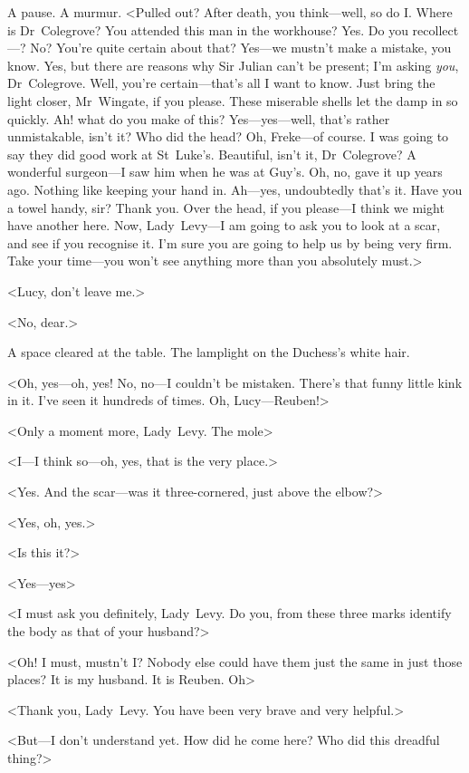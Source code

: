 A pause. A murmur. <Pulled out? After death, you think—well, so do I\@. Where is Dr~Colegrove? You attended this man in the workhouse? Yes. Do you recollect—? No? You're quite certain about that? Yes—we mustn't make a mistake, you know. Yes, but there are reasons why Sir Julian can't be present; I'm asking \emph{you}, Dr~Colegrove. Well, you're certain—that's all I want to know. Just bring the light closer, Mr~Wingate, if you please. These miserable shells let the damp in so quickly. Ah! what do you make of this? Yes—yes—well, that's rather unmistakable, isn't it? Who did the head? Oh, Freke—of course. I was going to say they did good work at St~Luke's. Beautiful, isn't it, Dr~Colegrove? A wonderful surgeon—I saw him when he was at Guy's. Oh, no, gave it up years ago. Nothing like keeping your hand in. Ah—yes, undoubtedly that's it. Have you a towel handy, sir? Thank you. Over the head, if you please—I think we might have another here. Now, Lady~Levy—I am going to ask you to look at a scar, and see if you recognise it. I'm sure you are going to help us by being very firm. Take your time—you won't see anything more than you absolutely must.>

<Lucy, don't leave me.>

<No, dear.>

A space cleared at the table. The lamplight on the Duchess's white hair.

<Oh, yes—oh, yes! No, no—I couldn't be mistaken. There's that funny little kink in it. I've seen it hundreds of times. Oh, Lucy—Reuben!>

<Only a moment more, Lady~Levy. The mole\longdash>

<I—I think so—oh, yes, that is the very place.>

<Yes. And the scar—was it three-cornered, just above the elbow?>

<Yes, oh, yes.>

<Is this it?>

<Yes—yes\longdash>

<I must ask you definitely, Lady~Levy. Do you, from these three marks identify the body as that of your husband?>

<Oh! I must, mustn't I\@? Nobody else could have them just the same in just those places? It is my husband. It is Reuben. Oh\longdash>

<Thank you, Lady~Levy. You have been very brave and very helpful.>

<But—I don't understand yet. How did he come here? Who did this dreadful thing?>

